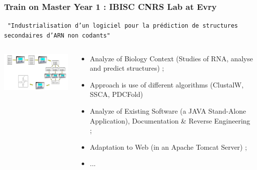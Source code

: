 \documentclass{beamer}
\begin{document}
\begin{frame}
	\frametitle{ Train on Master Year 1 : IBISC CNRS Lab at Evry }
	
	\texttt{ \small "Industrialisation d'un logiciel pour la pr{\'e}diction de structures secondaires d'ARN non codants"}
	
	\begin{columns}[T]
	\begin{column}[T]{6.5cm}
	
		\includegraphics[width=6.5cm]{img/illustrationStageIBISC.png} 
	
	\end{column}
	\begin{column}[T]{6.0cm}
	
		\begin{itemize}
			\item Analyze of Biology Context (Studies of RNA, analyse and predict structures) ; 
			\item Approach is use of different algorithms (ClustalW, SSCA, PDCFold)
			\item Analyze of Existing Software (a JAVA Stand-Alone Application), Documentation \& Reverse Engineering ; 
			\item Adaptation to Web (in an Apache Tomcat Server) ; 
			\item ... 
		\end{itemize}
		
	\end{column}
	\end{columns}
	
\end{frame}
\end{document}
